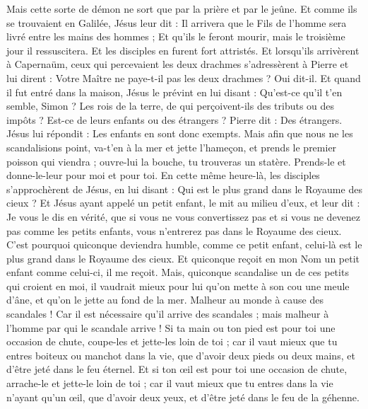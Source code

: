 \begin{multicols}{2}
Mais cette sorte de démon ne sort que par la prière et par le jeûne.
Et comme ils se trouvaient en Galilée, Jésus leur dit : Il arrivera que le Fils de l'homme sera livré entre les mains des hommes ;
Et qu'ils le feront mourir, mais le troisième jour il ressuscitera. Et les disciples en furent fort attristés.
Et lorsqu'ils arrivèrent à Capernaüm, ceux qui percevaient les deux drachmes s'adressèrent à Pierre et lui dirent : Votre Maître ne paye-t-il pas les deux drachmes ?
Oui dit-il. Et quand il fut entré dans la maison, Jésus le prévint en lui disant : Qu'est-ce qu'il t'en semble, Simon ? Les rois de la terre, de qui perçoivent-ils des tributs ou des impôts ? Est-ce de leurs enfants ou des étrangers ?
Pierre dit : Des étrangers. Jésus lui répondit : Les enfants en sont donc exempts.
Mais afin que nous ne les scandalisions point, va-t'en à la mer et jette l'hameçon, et prends le premier poisson qui viendra ; ouvre-lui la bouche, tu trouveras un statère. Prends-le et donne-le-leur pour moi et pour toi.
\VerseOne{}En cette même heure-là, les disciples s'approchèrent de Jésus, en lui disant : Qui est le plus grand dans le Royaume des cieux ?
Et Jésus ayant appelé un petit enfant, le mit au milieu d'eux,
et leur dit : Je vous le dis en vérité, que si vous ne vous convertissez pas et si vous ne devenez pas comme les petits enfants, vous n'entrerez pas dans le Royaume des cieux.
C'est pourquoi quiconque deviendra humble, comme ce petit enfant, celui-là est le plus grand dans le Royaume des cieux.
Et quiconque reçoit en mon Nom un petit enfant comme celui-ci, il me reçoit.
Mais, quiconque scandalise un de ces petits qui croient en moi, il vaudrait mieux pour lui qu'on mette à son cou une meule d'âne, et qu'on le jette au fond de la mer.
Malheur au monde à cause des scandales ! Car il est nécessaire qu'il arrive des scandales ; mais malheur à l'homme par qui le scandale arrive !
Si ta main ou ton pied est pour toi une occasion de chute, coupe-les et jette-les loin de toi ; car il vaut mieux que tu entres boiteux ou manchot dans la vie, que d'avoir deux pieds ou deux mains, et d'être jeté dans le feu éternel.
Et si ton œil est pour toi une occasion de chute, arrache-le et jette-le loin de toi ; car il vaut mieux que tu entres dans la vie n'ayant qu'un œil, que d'avoir deux yeux, et d'être jeté dans le feu de la géhenne.

\end{multicols}
